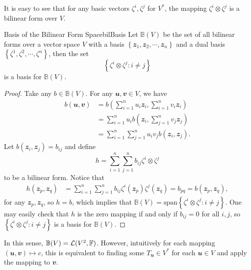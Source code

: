 \documentclass[math]{amznotes}
\theoremstyle{remark}
\begin{document}
It is easy to see that for any basic vectors $\zeta^i, \zeta^j$ for $V^*$, the mapping $\zeta^i \otimes \zeta^j$ is a bilinear form over $V$.
\begin{probox}{Basis of the Bilinear Form Space}{bilBasis}
    Let $\mathbb{B}(V)$ be the set of all bilinear forms over a vector space $V$ with a basis $\left\{\mathbfit{z}_1, \mathbfit{z}_2, \cdots, \mathbfit{z}_n\right\}$ and a dual basis $\left\{\zeta^1, \zeta^2, \cdots, \zeta^n\right\}$, then the set 
    \begin{equation*}
        \left\{\zeta^i \otimes \zeta^j \colon i \neq j \right\}
    \end{equation*}
    is a basis for $\mathbb{B}(V)$.
    \tcblower
    \begin{proof}
        Take any $b \in \mathbb{B}(V)$. For any $\mathbfit{u}, \mathbfit{v} \in V$, we have 
        \begin{align*}
            b(\mathbfit{u}, \mathbfit{v}) & = b\left(\sum_{i = 1}^{n}u_i\mathbfit{z}_i, \sum_{i = 1}^{n}v_i\mathbfit{z}_i\right) \\
            & = \sum_{i = 1}^{n}u_ib\left(\mathbfit{z}_i, \sum_{j = 1}^{n}v_j\mathbfit{z}_j\right) \\
            & = \sum_{i = 1}^{n}\sum_{j = 1}^{n}u_iv_jb\left(\mathbfit{z}_i, \mathbfit{z}_j\right).
        \end{align*}
        Let $b\left(\mathbfit{z}_i, \mathbfit{z}_j\right) = b_{ij}$ and define 
        \begin{equation*}
            h = \sum_{i = 1}^{n}\sum_{j = 1}^{n}b_{ij}\zeta^i \otimes \zeta^j
        \end{equation*}
        to be a bilinear form. Notice that 
        \begin{align*}
            h\left(\mathbfit{z}_p, \mathbfit{z}_q\right) & = \sum_{i = 1}^{n}\sum_{j = 1}^{n}b_{ij}\zeta^i\left(\mathbfit{z}_p\right)\zeta^j\left(\mathbfit{z}_q\right) = b_{pq} = b\left(\mathbfit{z}_p, \mathbfit{z}_q\right),
        \end{align*}
        for any $\mathbfit{z}_p, \mathbfit{z}_q$, so $h = b$, which implies that $\mathbb{B}(V) = \mathrm{span}\left\{\zeta^i \otimes \zeta^j \colon i \neq j \right\}$. One may easily check that $h$ is the zero mapping if and only if $b_{ij} = 0$ for all $i, j$, so~$\left\{\zeta^i \otimes \zeta^j \colon i \neq j \right\}$ is a basis for $\mathbb{B}(V)$.
    \end{proof}
\end{probox}
In this sense, $\mathbb{B}(V) = \mathcal{L}(V^2, \mathbb{F})$. However, intuitively for each mapping $(\mathbfit{u}, \mathbfit{v}) \mapsto c$, this is equivalent to finding some $T_{\mathbfit{u}} \in V^*$ for each $\mathbfit{u} \in V$ and apply the mapping to $\mathbfit{v}$.
\end{document}
